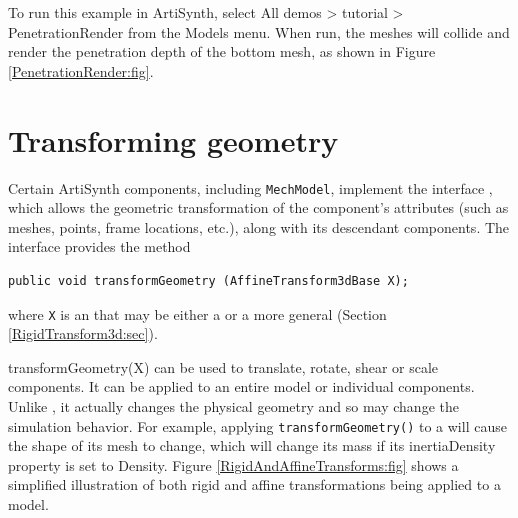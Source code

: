 To run this example in ArtiSynth, select {\sf All demos > tutorial >
PenetrationRender} from the {\sf Models} menu. When run, the meshes
will collide and render the penetration depth of the bottom mesh, 
as shown in Figure \ref{PenetrationRender:fig}.

\section{Transforming geometry}
\label{TransformingGeometry:sec}

Certain ArtiSynth components, including {\tt MechModel}, implement the
interface ,
which allows the geometric transformation of the component's
attributes (such as meshes, points, frame locations, etc.), along with
its descendant components. The interface provides the method
%
\begin{lstlisting}[]
   public void transformGeometry (AffineTransform3dBase X);
\end{lstlisting}
%
where {\tt X} is an 
that may be either a  or a
more general  (Section
\ref{RigidTransform3d:sec}).

%
{transformGeometry(X)}
can be used to translate, rotate, shear or scale components. It
can be applied to an entire model or individual components. Unlike
, it
actually changes the physical geometry and so may change the
simulation behavior. For example, applying {\tt transformGeometry()}
to a  will cause the
shape of its mesh to change, which will change its mass if its {\sf
inertiaDensity} property is set to {\sf Density}.
Figure \ref{RigidAndAffineTransforms:fig} shows a simplified
illustration of both rigid and affine transformations being applied to
a model.

